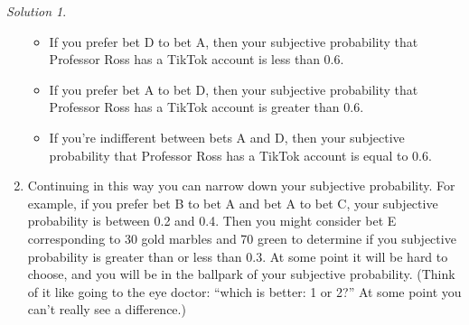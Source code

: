 \documentclass[
  letterpaper,
  DIV=11,
  numbers=noendperiod]{scrreprt}
\providecommand{\tightlist}{%
  \setlength{\itemsep}{0pt}\setlength{\parskip}{0pt}}
\theoremstyle{plain}
\theoremstyle{definition}
\theoremstyle{definition}
\theoremstyle{definition}
\theoremstyle{remark}
\newtheorem{refsolution}{Solution}[chapter]
\begin{document}
\begin{tcolorbox}
\begin{refsolution}
\begin{enumerate}
  \begin{itemize}
  \tightlist
  \item
    If you prefer bet D to bet A, then your subjective probability that
    Professor Ross has a TikTok account is less than 0.6.
  \item
    If you prefer bet A to bet D, then your subjective probability that
    Professor Ross has a TikTok account is greater than 0.6.
  \item
    If you're indifferent between bets A and D, then your subjective
    probability that Professor Ross has a TikTok account is equal to
    0.6.\\
  \end{itemize}
\item
  Continuing in this way you can narrow down your subjective
  probability. For example, if you prefer bet B to bet A and bet A to
  bet C, your subjective probability is between 0.2 and 0.4. Then you
  might consider bet E corresponding to 30 gold marbles and 70 green to
  determine if you subjective probability is greater than or less than
  0.3. At some point it will be hard to choose, and you will be in the
  ballpark of your subjective probability. (Think of it like going to
  the eye doctor: ``which is better: 1 or 2?'' At some point you can't
  really see a difference.)
\end{enumerate}

\label{sol-subjective-bet}

\end{refsolution}

\end{tcolorbox}
\end{document}
